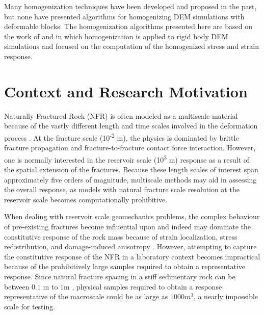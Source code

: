 Many homogenization techniques have been developed and proposed in the past, but none have presented algorithms for homogenizing DEM simulations with deformable blocks. The homogenization algorithms presented here are based on the work of \citet{daddetta_particle_2004} and \citet{wellmann_homogenization_2008} in which homogenization is applied to rigid body DEM simulations and focused on the computation of the homogenized stress and strain response. 

\section{Context and Research Motivation}

Naturally Fractured Rock (NFR) is often modeled as a multiscale material because of the vastly different length and time scales involved in the deformation process \citep{zhou_flow_2003}. At the fracture scale (10\textsuperscript{-2} m), the physics is dominated by brittle fracture propagation and fracture-to-fracture contact force interaction. However, one is normally interested in the reservoir scale (10\textsuperscript{3} m) response as a result of the spatial extension of the fractures. Because these length scales of interest span approximately five orders of magnitude, multiscale methods may aid in assessing the overall response, as models with natural fracture scale resolution at the reservoir scale becomes computationally prohibitive.

When dealing with reservoir scale geomechanics problems, the complex behaviour of pre-existing fractures become influential upon and indeed may dominate the constitutive response of the rock mass because of strain localization, stress redistribution, and damage-induced anisotropy \citep{Petracca_2015}. However, attempting to capture the constitutive response of the NFR in a laboratory context becomes impractical because of the prohibitively large samples required to obtain a representative response. Since natural fracture spacing in a stiff sedimentary rock can be between $0.1$ m to $1$m \citep{Nelson_2001}, physical samples required to obtain a response representative of the macroscale could be as large as $1000 m^3$, a nearly impossible scale for testing. 

